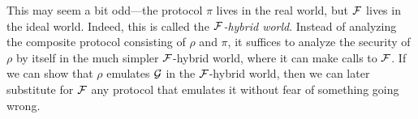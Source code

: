 This may seem a bit odd---the protocol $\pi$ lives in the real world, but $\mathcal{{F}}$
lives in the ideal world. Indeed, this is called the \emph{$\mathcal{{F}}$-hybrid
  world}. Instead of analyzing the composite protocol consisting of $\rho$ and $\pi$,
it suffices to analyze the security of $\rho$ by itself in the much simpler
$\mathcal{{F}}$-hybrid world, where it can make calls to $\mathcal{{F}}$. If we can show that
$\rho$ emulates $\mathcal{{G}}$ in the $\mathcal{{F}}$-hybrid world, then we can later substitute
for $\mathcal{{F}}$ any protocol that emulates it without fear of something going
wrong.

